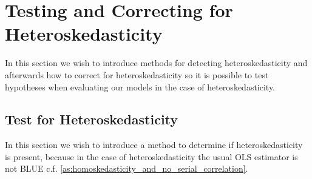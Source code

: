 \section{Testing and Correcting for Heteroskedasticity}
In this section we wish to introduce methods for detecting heteroskedasticity and afterwards how to correct for heteroskedasticity so it is possible to test hypotheses when evaluating our models in the case of heteroskedasticity.

\subsection{Test for Heteroskedasticity}
In this section we wish to introduce a method to determine if heteroskedasticity is present, because in the case of heteroskedasticity the usual OLS estimator is not BLUE c.f.$\!$ \ref{as:homoskedasticity_and_no_serial_correlation}. 

